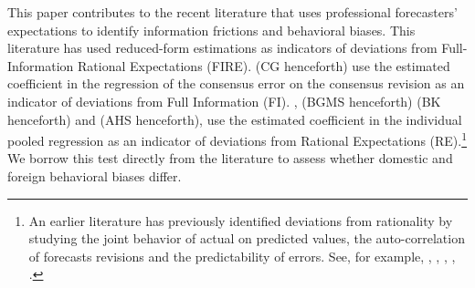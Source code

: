 
This paper contributes to the recent literature that uses professional forecasters' expectations to identify information frictions and behavioral biases. This literature has used reduced-form estimations as indicators of deviations from Full-Information Rational Expectations (FIRE). \citet{CoibionGorodnichenko2015} (CG henceforth) use the estimated coefficient in the regression of the consensus error on the consensus revision as an indicator of deviations from Full Information (FI). \citet{Bordaloetal2020}, (BGMS henceforth) \citet{BroerKohlhas2019} (BK henceforth) and \citet{Angeletosetal2020} (AHS henceforth), use the estimated coefficient in the individual pooled regression as an indicator of deviations from Rational Expectations (RE).\footnote{An earlier literature has previously identified deviations from rationality by studying the joint behavior of actual on predicted values, the auto-correlation of forecasts revisions and the predictability of errors. See, for example, \citet{MincerZarnowitz1969}, \citet{Zarnowitz1983}, \citet{Nordhaus1987}, \citet{Clements1997}, \citet{LahiriSheng2008}.} We borrow this test directly from the literature to assess whether domestic and foreign behavioral biases differ. 

